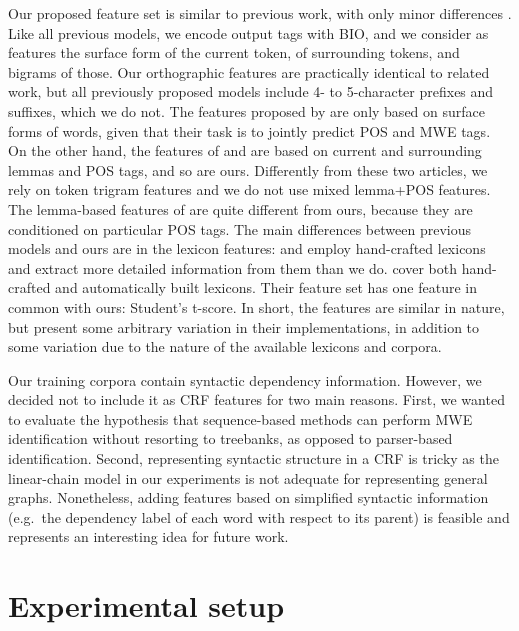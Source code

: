 \documentclass[output=paper,modfonts]{langscibook}
\begin{document}
Our proposed feature set is similar to previous work, with only minor differences \citep{constant-sigogne:2011:MWE,schneider2014,riedl-biemann:2016:MWE}. Like all previous models, we encode output tags with BIO, and we consider as features the surface form of the current token, of surrounding tokens, and bigrams of those. Our orthographic features are practically identical to related work, but all previously proposed models include 4- to 5-character prefixes and suffixes, which we do not. The features proposed by \citet{constant-sigogne:2011:MWE} are only based on surface forms of words, given that their task is to jointly predict POS and MWE tags. On the other hand, the features of \citet{schneider2014} and \citet{riedl-biemann:2016:MWE} are based on current and surrounding lemmas and POS tags, and so are ours. Differently from these two articles, we rely on token trigram features and we do not use mixed lemma+POS features. The lemma-based features of \citet{schneider2014} are quite different from ours, because they are conditioned on particular POS tags. The main differences between previous models and ours are in the lexicon features: \citet{constant-sigogne:2011:MWE} and \citet{schneider2014} employ hand-crafted lexicons and extract more detailed information from them than we do. \citet{riedl-biemann:2016:MWE} cover both hand-crafted and automatically built lexicons. Their feature set has one feature in common with ours: Student's t-score. In short, the features are similar in nature, but present some arbitrary variation in their implementations, in addition to some variation due to the nature of the available lexicons and corpora.

Our training corpora contain syntactic dependency information. However, we decided not to include it as CRF features for two main reasons. First, we wanted to evaluate the hypothesis that sequence-based methods can perform MWE identification without resorting to treebanks, as opposed to parser-based identification. Second, representing syntactic structure in a CRF is tricky as the linear-chain model in our experiments is not adequate for representing general graphs. Nonetheless, adding features based on simplified syntactic information (e.g.\ the dependency label of each word with respect to its parent) is feasible and represents an interesting idea for future work.



\section{Experimental setup}
\label{schol:sec:setup}
\end{document}
